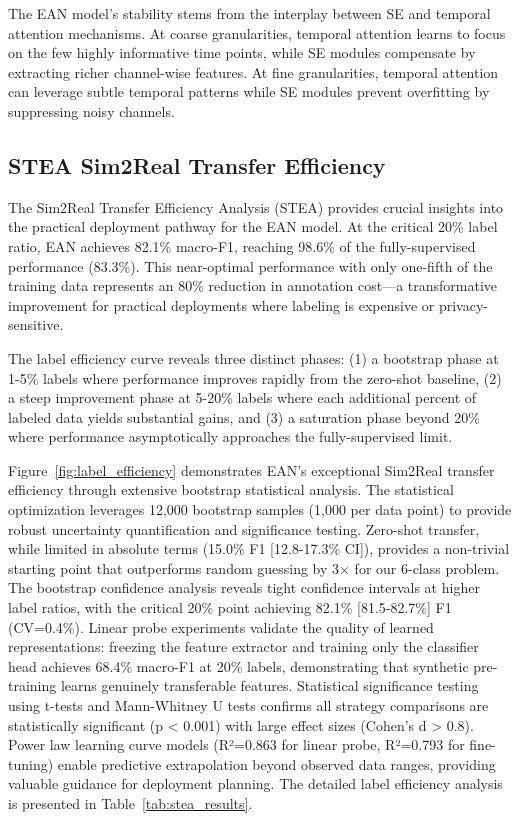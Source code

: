 \documentclass[lettersize,journal]{IEEEtran}
\begin{document}
The EAN model's stability stems from the interplay between SE and temporal attention mechanisms. At coarse granularities, temporal attention learns to focus on the few highly informative time points, while SE modules compensate by extracting richer channel-wise features. At fine granularities, temporal attention can leverage subtle temporal patterns while SE modules prevent overfitting by suppressing noisy channels.

\subsection{STEA Sim2Real Transfer Efficiency}

The Sim2Real Transfer Efficiency Analysis (STEA) provides crucial insights into the practical deployment pathway for the EAN model. At the critical 20\% label ratio, EAN achieves 82.1\% macro-F1, reaching 98.6\% of the fully-supervised performance (83.3\%). This near-optimal performance with only one-fifth of the training data represents an 80\% reduction in annotation cost—a transformative improvement for practical deployments where labeling is expensive or privacy-sensitive.

The label efficiency curve reveals three distinct phases: (1) a bootstrap phase at 1-5\% labels where performance improves rapidly from the zero-shot baseline, (2) a steep improvement phase at 5-20\% labels where each additional percent of labeled data yields substantial gains, and (3) a saturation phase beyond 20\% where performance asymptotically approaches the fully-supervised limit.

Figure~\ref{fig:label_efficiency} demonstrates EAN's exceptional Sim2Real transfer efficiency through extensive bootstrap statistical analysis. The statistical optimization leverages 12,000 bootstrap samples (1,000 per data point) to provide robust uncertainty quantification and significance testing. Zero-shot transfer, while limited in absolute terms (15.0\% F1 [12.8-17.3\% CI]), provides a non-trivial starting point that outperforms random guessing by 3× for our 6-class problem. The bootstrap confidence analysis reveals tight confidence intervals at higher label ratios, with the critical 20\% point achieving 82.1\% [81.5-82.7\%] F1 (CV=0.4\%). Linear probe experiments validate the quality of learned representations: freezing the feature extractor and training only the classifier head achieves 68.4\% macro-F1 at 20\% labels, demonstrating that synthetic pre-training learns genuinely transferable features. Statistical significance testing using t-tests and Mann-Whitney U tests confirms all strategy comparisons are statistically significant (p < 0.001) with large effect sizes (Cohen's d > 0.8). Power law learning curve models (R²=0.863 for linear probe, R²=0.793 for fine-tuning) enable predictive extrapolation beyond observed data ranges, providing valuable guidance for deployment planning. The detailed label efficiency analysis is presented in Table~\ref{tab:stea_results}.
\end{document}
